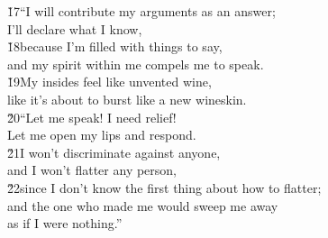 \begin{poetry}
\poeml \v{17}``I will contribute my arguments as an answer; \\
\poemll    I'll declare what I know, \\
\poeml \v{18}because I'm filled with things to say, \\
\poemll    and my spirit within me compels me to speak. \\
\poeml \v{19}My insides feel like unvented wine, \\
\poemll    like it's about to burst like a new wineskin. \\
\poeml \v{20}``Let me speak! I need relief! \\
\poemll    Let me open my lips and respond. \\
\poeml \v{21}I won't discriminate against anyone, \\
\poemll    and I won't flatter any person, \\
\poeml \v{22}since I don't know the first thing about how to flatter; \\
\poemll    and the one who made me would sweep me away \\
\poemlll       as if I were nothing.''
\end{poetry}

